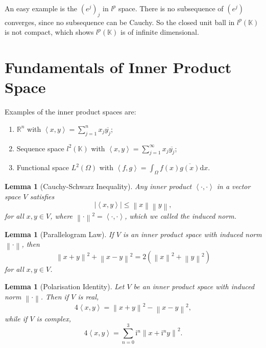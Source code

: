 \documentclass[12pt,a4paper]{article}
\numberwithin{equation}{section}
\theoremstyle{mystyle}
\newtheorem{lemma}[definition]{Lemma}
\newcommand{\R}{\mathbb{R}}
\newcommand{\K}{\mathbb{K}}
\renewcommand{\d}{\mathrm{d}}
\renewcommand{\i}{\mathbf{\mathrm{i}}}
\newcommand{\abs}[1]{\left\lvert #1 \right\rvert}
\newcommand{\norm}[1]{\left\lVert #1 \right\rVert}
\newcommand{\inner}[1]{\left\langle #1 \right\rangle}
\begin{document}
	An easy example is the $(e^j)_j$ in $l^p$ space. There is no subsequence of $(e^j)$ converges, since no subsequence can be Cauchy. So the closed unit ball in $l^p(\K)$ is not compact, which shows $l^p(\K)$ is of infinite dimensional.
	
	
	
	\section{Fundamentals of Inner Product Space}
	Examples of the inner product spaces are: 
	\begin{enumerate}
		\item $\R^n$ with $\inner{x,y}=\sum_{j=1}^n x_j \overline{y_j}$;
		\item Sequence space $l^2(\K)$ with $\inner{x,y}=\sum_{j=1}^\infty x_j \overline{y_j}$;
		\item Functional space $L^2(\Omega)$ with $\inner{f,g}=\int_{\Omega} f(x)\overline{g(x)}\d x$.
	\end{enumerate}
	\begin{lemma}[Cauchy-Schwarz Inequality]
		Any inner product $\inner{\cdot,\cdot}$ in a vector space $V$ satisfies
		\begin{equation}
			\abs{\inner{x,y}}\leq \norm{x}\norm{y},
		\end{equation}
		for all $x,y\in V$, where $\norm{\cdot}^2=\inner{\cdot,\cdot}$, which we called the \emph{induced norm}.
	\end{lemma}
	
	\begin{lemma}[Parallelogram Law]
		If $V$ is an inner product space with induced norm $\norm{\cdot}$, then
		\begin{equation}
		\norm{x+y}^2 + \norm{x-y}^2 = 2(\norm{x}^2+\norm{y}^2)
		\label{eq:parallelogram}
		\end{equation}
		for all $x,y\in V$.
	\end{lemma}

	\begin{lemma}[Polarisation Identity]
		Let $V$ be an inner product space with induced norm $\norm{\cdot}$. Then if $V$ is real,
		\begin{equation}
			4\inner{x,y}=\norm{x+y}^2 - \norm{x-y}^2,\label{eq:polar}
		\end{equation}
		while if $V$ is complex,
		\begin{equation}
			4\inner{x,y}=\sum_{n=0}^3 \i^n \norm{x+\i^n y}^2.
		\end{equation}
	\end{lemma}
	
\end{document}
